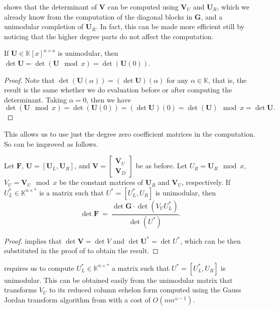  shows that the determinant of
$\mathbf{V}$ can be computed using $\mathbf{V}_{U}$ and $\mathbf{U}_{R}$,
which we already know from the computation of the diagonal blocks
in $\mathbf{G}$, and a unimodular completion of $\mathbf{U}_{R}$.
In fact, this can be made more efficient still by noticing that the
higher degree parts do not affect the computation.
\begin{lem}
\label{lem:determinantOfUnimodular}If $\mathbf{U}\in\mathbb{K}\left[x\right]^{n\times n}$
is unimodular, then $\det\mathbf{U}=\det\left(\mathbf{U}\mod x\right)=\det\left(\mathbf{U}\left(0\right)\right)$.\end{lem}
\begin{proof}
Note that $\det\left(\mathbf{U}\left(\alpha\right)\right)=\left(\det\mathbf{U}\right)\left(\alpha\right)$
for any $\alpha\in\mathbb{K}$, that is, the result is the same whether
we do evaluation before or after computing the determinant. Taking
$\alpha=0$, then we have 
\[
\det\left(\mathbf{U}\mod x\right)=\det\left(\mathbf{U}\left(0\right)\right)=\left(\det\mathbf{U}\right)\left(0\right)=\det\left(\mathbf{U}\right)\mod x=\det\mathbf{U}.
\]

\end{proof}
This allows us to use just the degree zero coefficient matrices in
the computation. So  can be improved
as follows.
\begin{lem}
\label{lem:scalingToDeterminantSimplified} Let $\mathbf{F}$, $\mathbf{U}=\left[\mathbf{U}_{L},\mathbf{U}_{R}\right]$,
and $\mathbf{V}=\begin{bmatrix}\mathbf{V}_{U}\\
\mathbf{V}_{D}
\end{bmatrix}$ be as before. Let $U_{R}=\mathbf{U}_{R}\mod x$, $V_{U}=\mathbf{V}_{U}\mod x$
be the constant matrices of $\mathbf{U}_{R}$ and $\mathbf{V}_{U}$,
respectively. If $U_{L}^{*}\in\mathbb{K}^{n\times*}$ is a matrix
such that $U^{*}=\left[U_{L}^{*},U_{R}\right]$ is unimodular, then
\[
\det\mathbf{F}~=~\frac{\det\mathbf{G}\cdot\det\left(V_{U}U_{L}^{*}\right)}{\det\left(U^{*}\right)}.
\]
 \end{lem}
\begin{proof}
 implies that $\det\mathbf{V}=\det V$
and $\det\mathbf{U}^{*}=\det U^{*}$, which can be then substituted
in the proof of  to obtain the
result.\end{proof}
\begin{rem}
 requires us to compute
$U_{L}^{*}\in\mathbb{K}^{n\times*}$ a matrix such that $U^{*}=\left[U_{L}^{*},U_{R}\right]$
is unimodular. This can be obtained easily from the unimodular matrix
that transforms $V_{U}$ to its reduced column echelon form computed
using the Gauss Jordan transform algorithm from \citep{storjohann:phd2000}
with a cost of $O\left(nm^{\omega-1}\right)$. 
\end{rem}
